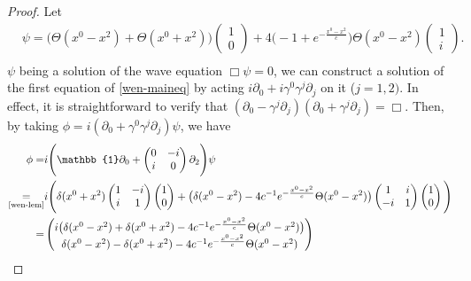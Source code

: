 \begin{proof}
Let 
\begin{equation*}
\begin{split}
& \psi = \big(\Theta(x^0 - x^2) + \Theta(x^0 + x^2) \big) 
\begin{pmatrix} 1 \\ 0 \end{pmatrix} 
+ 4\big(-1+ e^{-\frac{x^0 - x^2}{c}}\big)\Theta(x^0-x^2)\begin{pmatrix} 1 \\ i \end{pmatrix}. \\
\end{split}
\end{equation*}
$\psi$ being a solution of the wave equation $\Box \psi = 0$,
we can construct a solution of the first equation of \cref{wen-maineq} by acting $i\partial_0 + i\gamma^0\gamma^j \partial_j$ on it ($j= 1, 2)$.
In effect, it is straightforward to verify that $(\partial_0 - \gamma^j\partial_j)(\partial_0 + \gamma^j\partial_j) = \Box$. 
Then, by taking $\phi = i(\partial_0 + \gamma^0\gamma^j\partial_j)\psi$, we have
\begin{equation*}
\begin{split}
\phi = &
i\Bigg(\mathbb{1}\partial_0 + \begin{pmatrix} 0 &-i \\ i &0\end{pmatrix}\partial_2  \Bigg)\psi \\
\underset{\textrm{\cref{wen-lem}}}{=}&
i\Bigg( \delta(x^0 + x^2)\begin{pmatrix} 1 & -i \\ i & 1 \end{pmatrix} \begin{pmatrix}1 \\ 0 \end{pmatrix}
+ \big( \delta(x^0 - x^2) - 4c^{-1} e^{-\frac{x^0-x^2}{c}}\Theta(x^0-x^2)\big)
\begin{pmatrix} 1 & i \\ -i & 1 \end{pmatrix} \begin{pmatrix}1 \\ 0 \end{pmatrix} \Bigg) \\
= &
\begin{pmatrix}
i \big(\delta(x^0 - x^2) + \delta(x^0 + x^2) - 4c^{-1}e^{- \frac{x^0-x^2}{c}}\Theta(x^0-x^2) \big) \\
\delta({x^0 - x^2}) - \delta(x^0 + x^2) - 4c^{-1}e^{- \frac{x^0-x^2}{c}}\Theta(x^0-x^2) \end{pmatrix}

\end{split}
\end{equation*}
\end{proof}
